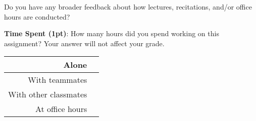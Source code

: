 \documentclass[12pt]{article}
\begin{document}
Do you have any broader feedback about how lectures, recitations, and/or office hours are conducted?
\begin{solution}[height=4cm]
\end{solution}


\noindent\textbf{Time Spent (1pt)}: How many hours did you spend working on this assignment? Your answer will not affect your grade.
\begin{table}[H]
    \centering
    \begin{tabular}{r|c}
        Alone &  \hspace{3em} %
        \\ \hline
        With teammates & \hspace{3em} %
        \\ \hline
        With other classmates & \hspace{3em} %
        \\ \hline
        At office hours & \hspace{3em} %
        \\ \hline
    \end{tabular}
\end{table}
\end{document}
